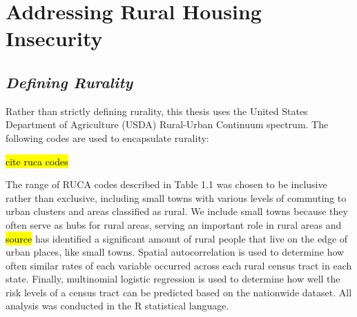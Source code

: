 \chapter{Addressing Rural Housing Insecurity}	%

\section{\textit{Defining Rurality}}
Rather than strictly defining rurality, this thesis uses the United States Department of Agriculture (USDA) Rural-Urban Continuum spectrum. The following codes are used to encapsulate rurality:


\hl{cite ruca codes}

The range of RUCA codes described in Table 1.1 was chosen to be inclusive rather than exclusive, including small towns with various levels of commuting to urban clusters and areas classified as rural. We include small towns because they often serve as hubs for rural areas, serving an important role in rural areas and \hl{source} has identified a significant amount of rural people that live on the edge of urban places, like small towns. Spatial autocorrelation is used to determine how often similar rates of each variable occurred across each rural census tract in each state. Finally, multinomial logistic regression is used to determine how well the risk levels of a census tract can be predicted based on the nationwide dataset.  All analysis was conducted in the R statistical language.  

